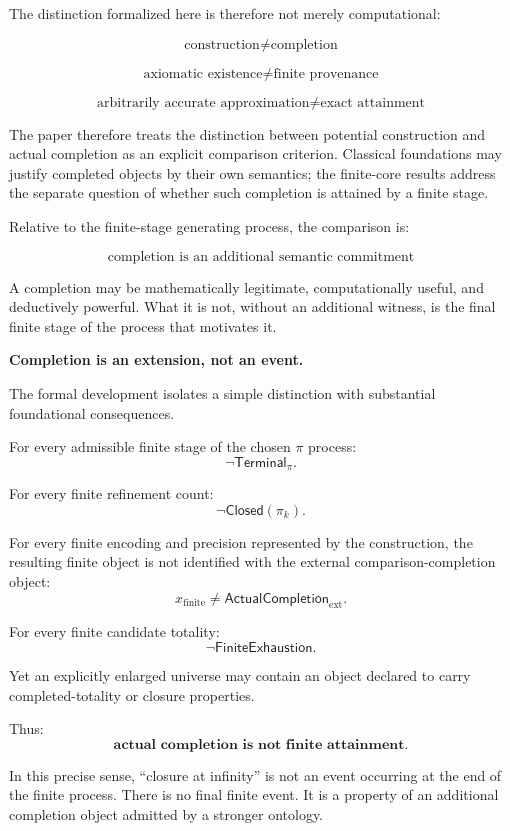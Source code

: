 \documentclass[11pt,a4paper]{article}
\newcommand{\Closed}{\mathsf{Closed}}
\newcommand{\Terminal}{\mathsf{Terminal}}
\newcommand{\ExternalCompletion}{\mathsf{ActualCompletion}_{\mathrm{ext}}}
\newcommand{\FiniteExhaustion}{\mathsf{FiniteExhaustion}}
\begin{document}
The distinction formalized here is therefore not merely computational:

\[
\boxed{
\text{construction}
\neq
\text{completion}
}
\]

\[
\boxed{
\text{axiomatic existence}
\neq
\text{finite provenance}
}
\]

\[
\boxed{
\text{arbitrarily accurate approximation}
\neq
\text{exact attainment}
}
\]

The paper therefore treats the distinction between potential
construction and actual completion as an explicit comparison
criterion. Classical foundations may justify completed objects by
their own semantics; the finite-core results address the separate
question of whether such completion is attained by a finite stage.

Relative to the finite-stage generating process, the comparison is:

\[
\boxed{
\text{completion is an additional semantic commitment}
}
\]

A completion may be mathematically legitimate, computationally useful,
and deductively powerful. What it is not, without an additional
witness, is the final finite stage of the process that motivates it.

\begin{center}
\textbf{Completion is an extension, not an event.}
\end{center}



The formal development isolates a simple distinction with substantial
foundational consequences.

For every admissible finite stage of the chosen $\pi$ process:
\[
\neg\Terminal_\pi.
\]

For every finite refinement count:
\[
\neg\Closed(\pi_k).
\]

For every finite encoding and precision represented by the
construction, the resulting finite object is not identified with the
external comparison-completion object:
\[
x_{\mathrm{finite}}
\neq
\ExternalCompletion.
\]

For every finite candidate totality:
\[
\neg\FiniteExhaustion.
\]

Yet an explicitly enlarged universe may contain an object declared to
carry completed-totality or closure properties.

Thus:
\[
\boxed{
\textbf{actual completion is not finite attainment.}
}
\]

In this precise sense, ``closure at infinity'' is not an event occurring
at the end of the finite process. There is no final finite event.
It is a property of an additional completion object admitted by a
stronger ontology.
\end{document}
